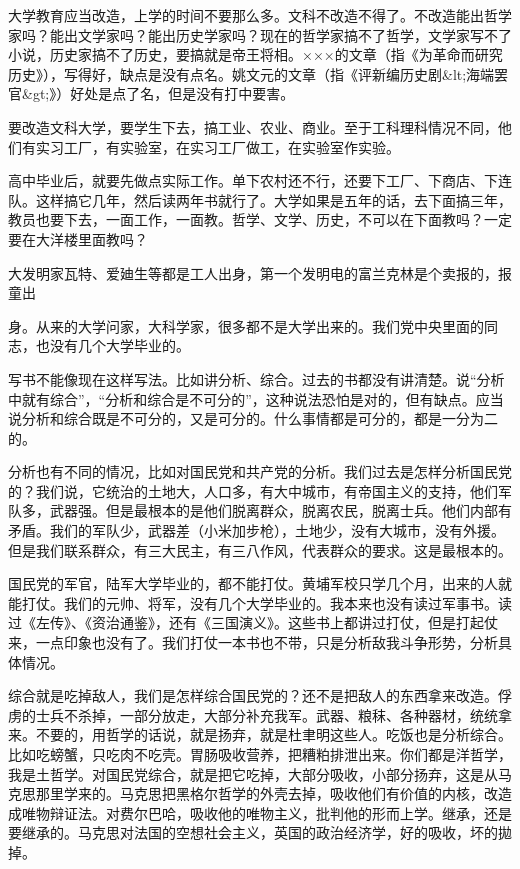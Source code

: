大学教育应当改造，上学的时间不要那么多。文科不改造不得了。不改造能出哲学家吗？能出文学家吗？能出历史学家吗？现在的哲学家搞不了哲学，文学家写不了小说，历史家搞不了历史，要搞就是帝王将相。×××的文章（指《为革命而研究历史》），写得好，缺点是没有点名。姚文元的文章（指《评新编历史剧&lt;海端罢官&gt;》）好处是点了名，但是没有打中要害。

要改造文科大学，要学生下去，搞工业、农业、商业。至于工科理科情况不同，他们有实习工厂，有实验室，在实习工厂做工，在实验室作实验。

高中毕业后，就要先做点实际工作。单下农村还不行，还要下工厂、下商店、下连队。这样搞它几年，然后读两年书就行了。大学如果是五年的话，去下面搞三年，教员也要下去，一面工作，一面教。哲学、文学、历史，不可以在下面教吗？一定要在大洋楼里面教吗？

大发明家瓦特、爱廸生等都是工人出身，第一个发明电的富兰克林是个卖报的，报童出

身。从来的大学问家，大科学家，很多都不是大学出来的。我们党中央里面的同志，也没有几个大学毕业的。

写书不能像现在这样写法。比如讲分析、综合。过去的书都没有讲清楚。说“分析中就有综合”，“分析和综合是不可分的”，这种说法恐怕是对的，但有缺点。应当说分析和综合既是不可分的，又是可分的。什么事情都是可分的，都是一分为二的。

分析也有不同的情况，比如对国民党和共产党的分析。我们过去是怎样分析国民党的？我们说，它统治的土地大，人口多，有大中城市，有帝国主义的支持，他们军队多，武器强。但是最根本的是他们脱离群众，脱离农民，脱离士兵。他们内部有矛盾。我们的军队少，武器差（小米加步枪），土地少，没有大城市，没有外援。但是我们联系群众，有三大民主，有三八作风，代表群众的要求。这是最根本的。

国民党的军官，陆军大学毕业的，都不能打仗。黄埔军校只学几个月，出来的人就能打仗。我们的元帅、将军，没有几个大学毕业的。我本来也没有读过军事书。读过《左传》、《资治通鉴》，还有《三国演义》。这些书上都讲过打仗，但是打起仗来，一点印象也没有了。我们打仗一本书也不带，只是分析敌我斗争形势，分析具体情况。

综合就是吃掉敌人，我们是怎样综合国民党的？还不是把敌人的东西拿来改造。俘虏的士兵不杀掉，一部分放走，大部分补充我军。武器、粮秣、各种器材，统统拿来。不要的，用哲学的话说，就是扬弃，就是杜聿明这些人。吃饭也是分析综合。比如吃螃蟹，只吃肉不吃壳。胃肠吸收营养，把糟粕排泄出来。你们都是洋哲学，我是土哲学。对国民党综合，就是把它吃掉，大部分吸收，小部分扬弃，这是从马克思那里学来的。马克思把黑格尔哲学的外壳去掉，吸收他们有价值的内核，改造成唯物辩证法。对费尔巴哈，吸收他的唯物主义，批判他的形而上学。继承，还是要继承的。马克思对法国的空想社会主义，英国的政治经济学，好的吸收，坏的拋掉。


